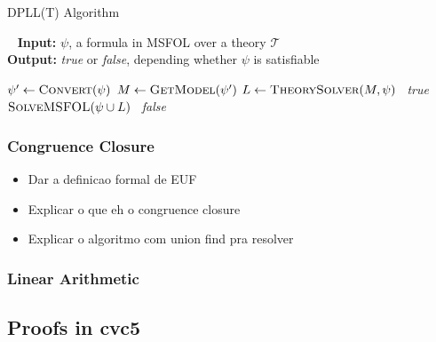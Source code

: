 \begin{algorithm}[H]
\caption{DPLL(T) Algorithm}~\label{dpllTAlgo}
    \hspace*{\algorithmicindent} \textbf{Input:} $\psi$, a formula in MSFOL over a theory  $\mathcal{T}$ \\
    \hspace*{\algorithmicindent} \textbf{Output:} \textit{true} or \textit{false}, depending whether $\psi$ is satisfiable
\begin{algorithmic}

\State $\psi' \gets \Call{Convert}{\psi}$
  \State $M \gets \Call{GetModel}{\psi'}$
  \State $L \gets \Call{TheorySolver}{M, \psi}$
    \State~\Return \textit{true}
  \Else
    \State~\Return $\Call{SolveMSFOL}{\psi \cup L}$
  \EndIf
\Else
  \State~\Return \textit{false}
\EndIf


\EndFunction
\end{algorithmic}
\end{algorithm}

\subsubsection{Congruence Closure}

\begin{itemize}
  \item Dar a definicao formal de EUF
  \item Explicar o que eh o congruence closure
  \item Explicar o algoritmo com union find pra resolver
\end{itemize}

\subsubsection{Linear Arithmetic}


\subsection{Proofs in cvc5}
